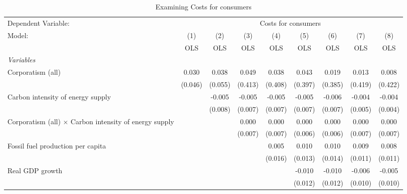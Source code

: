 
\begin{table}[htbp]
   \caption{Examining Costs for consumers}
   \centering
   \begin{tabular}{lcccccccc}
      \toprule
      Dependent Variable: & \multicolumn{8}{c}{Costs for consumers}\\
      Model:                                                        & (1)     & (2)     & (3)     & (4)     & (5)     & (6)     & (7)     & (8)\\  
                                                                    &  OLS    & OLS     & OLS     & OLS     & OLS     & OLS     & OLS     & OLS\\  
      \midrule
      \emph{Variables}\\
      Corporatism (all)                                             & 0.030   & 0.038   & 0.049   & 0.038   & 0.043   & 0.019   & 0.013   & 0.008\\   
                                                                    & (0.046) & (0.055) & (0.413) & (0.408) & (0.397) & (0.385) & (0.419) & (0.422)\\   
      Carbon intensity of energy supply                             &         & -0.005  & -0.005  & -0.005  & -0.005  & -0.006  & -0.004  & -0.004\\   
                                                                    &         & (0.008) & (0.007) & (0.007) & (0.007) & (0.007) & (0.005) & (0.004)\\   
      Corporatism (all) $\times$ Carbon intensity of energy supply  &         &         & 0.000   & 0.000   & 0.000   & 0.000   & 0.000   & 0.000\\   
                                                                    &         &         & (0.007) & (0.007) & (0.006) & (0.006) & (0.007) & (0.007)\\   
      Fossil fuel production per capita                             &         &         &         & 0.005   & 0.010   & 0.010   & 0.009   & 0.008\\   
                                                                    &         &         &         & (0.016) & (0.013) & (0.014) & (0.011) & (0.011)\\   
      Real GDP growth                                               &         &         &         &         & -0.010  & -0.010  & -0.006  & -0.005\\   
                                                                    &         &         &         &         & (0.012) & (0.012) & (0.010) & (0.010)\\   

\end{tabular}
\end{table}

